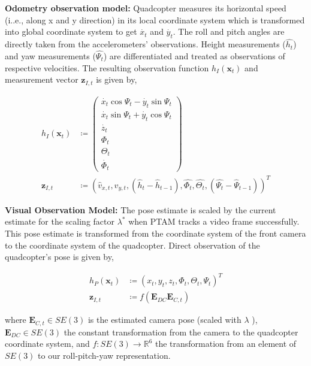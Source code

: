 \textbf{Odometry observation model:} Quadcopter measures its horizontal speed
(i..e., along x and y direction) in its local coordinate system which is
transformed into global coordinate system to get $\dot{x_t}$ and $\dot{y_t}$.
The roll and pitch angles are directly taken from the accelerometers'
observations. Height measurements ($\hat{h_t}$) and yaw measurements
($\hat{{\Psi}_t}$) are differentiated and treated as observations of respective
velocities. The resulting observation function $h_I(\mathbf{x}_t)$ and
measurement vector $\mathbf{z}_{I,t}$ is given by,
\begin{ceqn}

\begin{align}
	h_I(\mathbf{x}_t) &\coloneqq  
	\begin{pmatrix} 
		\dot{x_t}\cos{{\Psi}_t} - \dot{y_t}\sin{{\Psi}_t} \\
		\dot{x_t}\sin{{\Psi}_t} + \dot{y_t}\cos{{\Psi}_t} \\
		\dot{z_t} \\
		{\Phi}_t \\
		{\Theta}_t \\
		\dot{{\Phi}_t}   	
	\end{pmatrix}
	\\
	\mathbf{z}_{I,t} &\coloneqq (\hat{v}_{x,t}, \hat{v}_{y,t}, (\hat{h}_t -
	\hat{h}_{t-1}), \hat{{\Phi}_t}, \hat{{\Theta}_t}, (\hat{{\Psi}_t} - \hat{{\Psi}}_{t-1}  ) )^T
\end{align}
\end{ceqn}
\textbf{Visual Observation Model:} The pose estimate is scaled by the
current estimate for the scaling factor ${\lambda}^{*}$ when PTAM tracks a
video frame successfully. This pose estimate is transformed from the coordinate
system of the front camera to the coordinate system of the quadcopter. Direct
observation of the quadcopter’s pose is given by,
\begin{ceqn}

\begin{align}
	  h_P(\mathbf{x}_t) &\coloneqq  {(x_t, y_t, z_t, {\Phi}_t, {\Theta}_t,
	  {\Psi}_t)}^T \\
	  \mathbf{z}_{I,t} &\coloneqq
	  f(\mathbf{E}_{\mathit{DC}}\mathbf{E}_{\mathit{C},t} )
\end{align}
\end{ceqn}

where $\mathbf{E}_{\mathit{C},t} \in SE(3)$ is the estimated camera pose (scaled
with $\lambda$ ), $\mathbf{E}_{\mathit{DC}} \in SE(3)$ the constant
transformation from the camera to the quadcopter coordinate system, and $f :
SE(3) \rightarrow \mathbb{R}^6$ the transformation from an element of $SE(3)$ to
our roll-pitch-yaw representation.

